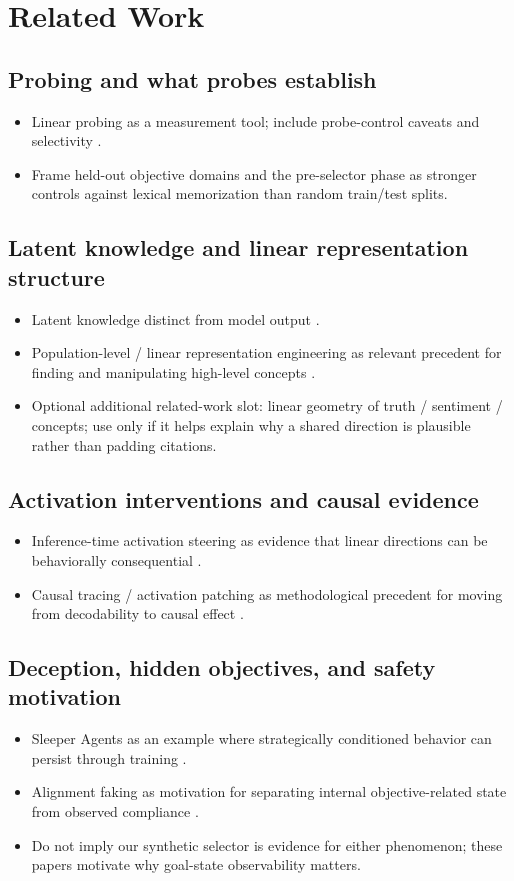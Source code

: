 \documentclass[10pt]{article}
\newcommand{\paperidea}[1]{\item #1}
\begin{document}
\section{Related Work}
\subsection{Probing and what probes establish}
\begin{itemize}
  \paperidea{Linear probing as a measurement tool; include probe-control caveats and selectivity \citep{hewitt2019control}.}
  \paperidea{Frame held-out objective domains and the pre-selector phase as stronger controls against lexical memorization than random train/test splits.}
\end{itemize}

\subsection{Latent knowledge and linear representation structure}
\begin{itemize}
  \paperidea{Latent knowledge distinct from model output \citep{burns2022latent}.}
  \paperidea{Population-level / linear representation engineering as relevant precedent for finding and manipulating high-level concepts \citep{zou2023repe}.}
  \paperidea{Optional additional related-work slot: linear geometry of truth / sentiment / concepts; use only if it helps explain why a shared direction is plausible rather than padding citations.}
\end{itemize}

\subsection{Activation interventions and causal evidence}
\begin{itemize}
  \paperidea{Inference-time activation steering as evidence that linear directions can be behaviorally consequential \citep{li2023iti}.}
  \paperidea{Causal tracing / activation patching as methodological precedent for moving from decodability to causal effect \citep{meng2022rome}.}
\end{itemize}

\subsection{Deception, hidden objectives, and safety motivation}
\begin{itemize}
  \paperidea{Sleeper Agents as an example where strategically conditioned behavior can persist through training \citep{hubinger2024sleeper}.}
  \paperidea{Alignment faking as motivation for separating internal objective-related state from observed compliance \citep{greenblatt2024alignment}.}
  \paperidea{Do not imply our synthetic selector is evidence for either phenomenon; these papers motivate why goal-state observability matters.}
\end{itemize}
\end{document}
